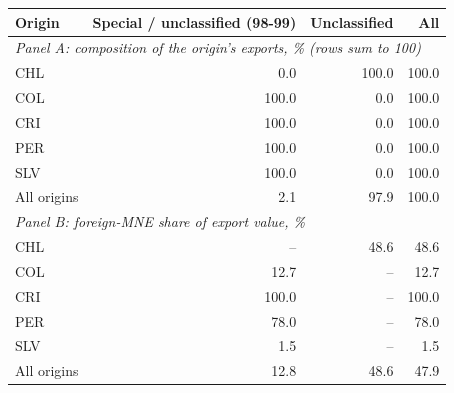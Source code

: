 \begin{tabular}{lrrr}
\toprule
Origin & Special / unclassified (98-99) & Unclassified & All \\
\midrule
\multicolumn{4}{l}{\textit{Panel A: composition of the origin's exports, \% (rows sum to 100)}} \\
CHL & 0.0 & 100.0 & 100.0 \\
COL & 100.0 & 0.0 & 100.0 \\
CRI & 100.0 & 0.0 & 100.0 \\
PER & 100.0 & 0.0 & 100.0 \\
SLV & 100.0 & 0.0 & 100.0 \\
All origins & 2.1 & 97.9 & 100.0 \\
\midrule
\multicolumn{4}{l}{\textit{Panel B: foreign-MNE share of export value, \%}} \\
CHL & -- & 48.6 & 48.6 \\
COL & 12.7 & -- & 12.7 \\
CRI & 100.0 & -- & 100.0 \\
PER & 78.0 & -- & 78.0 \\
SLV & 1.5 & -- & 1.5 \\
All origins & 12.8 & 48.6 & 47.9 \\
\bottomrule
\end{tabular}

